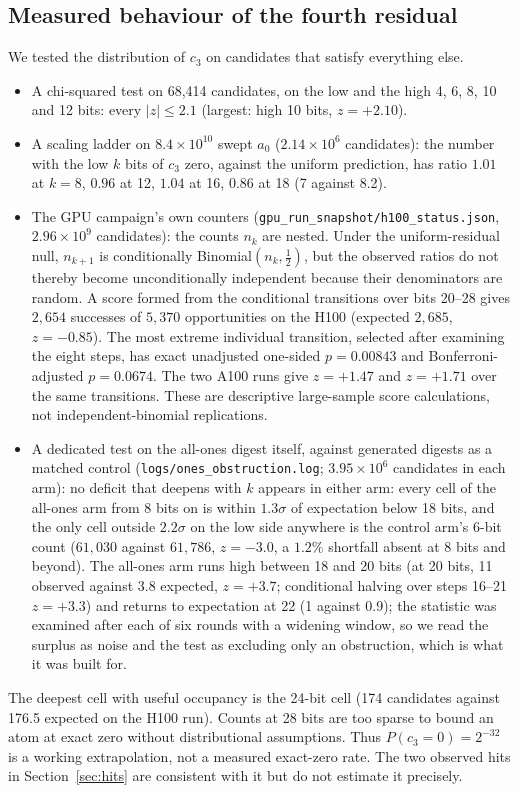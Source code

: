 \documentclass[11pt,a4paper]{article}
\begin{document}
\subsection{Measured behaviour of the fourth residual}
\label{sec:c3}

We tested the distribution of $c_3$ on candidates that satisfy everything
else.
\begin{itemize}
\item A chi-squared test on 68{,}414 candidates, on the low and the high
  4, 6, 8, 10 and 12 bits: every $|z|\le 2.1$ (largest: high 10 bits, $z=+2.10$).
\item A scaling ladder on $8.4\times10^{10}$ swept $a_0$ ($2.14\times10^{6}$
  candidates): the number with the low $k$ bits of $c_3$ zero, against the
  uniform prediction, has ratio $1.01$ at $k=8$, $0.96$ at 12, $1.04$ at 16,
  $0.86$ at 18 (7 against 8.2).
\item The GPU campaign's own counters
  (\texttt{gpu\_run\_snapshot/h100\_status.json}, $2.96\times10^{9}$
  candidates): the counts $n_k$ are nested.  Under the uniform-residual null,
  $n_{k+1}$ is conditionally Binomial$(n_k,\tfrac12)$, but the observed ratios
  do not thereby become unconditionally independent because their denominators
  are random.  A score formed from the conditional transitions over bits
  20--28 gives $2{,}654$ successes of $5{,}370$ opportunities on the H100
  (expected $2{,}685$, $z=-0.85$).  The most extreme individual transition,
  selected after examining the eight steps, has exact unadjusted one-sided
  $p=0.00843$ and Bonferroni-adjusted $p=0.0674$.  The two A100 runs give
  $z=+1.47$ and $z=+1.71$ over the same transitions.  These are descriptive
  large-sample score calculations, not independent-binomial replications.
\item A dedicated test on the all-ones digest itself, against generated digests
  as a matched control (\texttt{logs/ones\_obstruction.log};
  $3.95\times10^{6}$ candidates in each arm): no deficit that deepens with $k$ appears in either arm: every cell of the
  all-ones arm from 8 bits on is within $1.3\sigma$ of expectation below 18
  bits, and the only cell outside $2.2\sigma$ on the low side anywhere is the
  control arm's 6-bit count ($61{,}030$ against $61{,}786$, $z=-3.0$, a $1.2\%$
  shortfall absent at 8 bits and beyond).  The all-ones arm runs high between
  18 and 20 bits (at 20 bits, 11 observed against 3.8 expected, $z=+3.7$;
  conditional halving over steps 16--21 $z=+3.3$) and returns to expectation
  at 22 (1 against 0.9); the statistic was examined after each of six rounds
  with a widening window, so we read the surplus as noise and the test as
  excluding only an obstruction, which is what it was built for.
\end{itemize}
The deepest cell with useful occupancy is the 24-bit cell (174 candidates
against 176.5 expected on the H100 run).  Counts at 28 bits are too sparse to
bound an atom at exact zero without distributional assumptions.  Thus
$P(c_3=0)=2^{-32}$ is a working extrapolation, not a measured exact-zero rate.
The two observed hits in Section~\ref{sec:hits} are consistent with it but do
not estimate it precisely.
\end{document}
